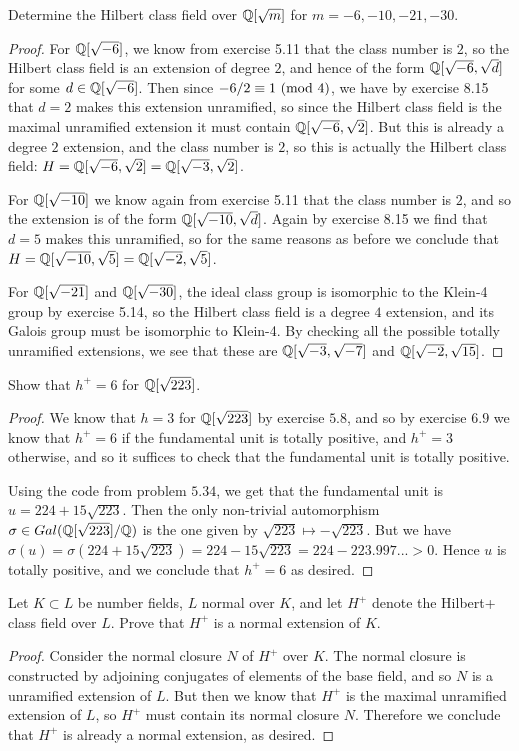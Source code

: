 \documentclass[11pt]{article}
\begin{document}
Determine the Hilbert class field over $\mathbb{Q}[\sqrt{m}]$ for $m = -6, -10, -21, -30$.
\begin{proof}
  For $\mathbb{Q}[\sqrt{-6}]$, we know from exercise 5.11 that the class number is $2$, so the Hilbert class field is an extension of degree $2$, and hence of the form $\mathbb{Q}[\sqrt{-6}, \sqrt{d}]$ for some $d \in \mathbb{Q}[\sqrt{-6}]$.
  Then since $-6/2 \equiv 1\ (\text{mod}\ 4)$, we have by exercise 8.15 that $d = 2$ makes this extension unramified, so since the Hilbert class field is the maximal unramified extension it must contain $\mathbb{Q}[\sqrt{-6}, \sqrt{2}]$.
  But this is already a degree $2$ extension, and the class number is $2$, so this is actually the Hilbert class field: $H = \mathbb{Q}[\sqrt{-6}, \sqrt{2}] = \mathbb{Q}[\sqrt{-3}, \sqrt{2}]$.

  For $\mathbb{Q}[\sqrt{-10}]$ we know again from exercise 5.11 that the class number is $2$, and so the extension is of the form $\mathbb{Q}[\sqrt{-10}, \sqrt{d}]$.
  Again by exercise 8.15 we find that $d = 5$ makes this unramified, so for the same reasons as before we conclude that $H = \mathbb{Q}[\sqrt{-10}, \sqrt{5}] = \mathbb{Q}[\sqrt{-2}, \sqrt{5}]$.

  For $\mathbb{Q}[\sqrt{-21}]$ and $\mathbb{Q}[\sqrt{-30}]$, the ideal class group is isomorphic to the Klein-4 group by exercise 5.14, so the Hilbert class field is a degree $4$ extension, and its Galois group must be isomorphic to Klein-4.
  By checking all the possible totally unramified extensions, we see that these are $\mathbb{Q}[\sqrt{-3},\sqrt{-7}]$ and $\mathbb{Q}[\sqrt{-2},\sqrt{15}]$.
\end{proof}


Show that $h^+ = 6$ for $\mathbb{Q}[\sqrt{223}]$.
\begin{proof}
  We know that $h = 3$ for $\mathbb{Q}[\sqrt{223}]$ by exercise $5.8$, and so by exercise $6.9$ we know that $h^+ = 6$ if the fundamental unit is totally positive, and $h^+ = 3$ otherwise, and so it suffices to check that the fundamental unit is totally positive.

  Using the code from problem $5.34$, we get that the fundamental unit is $u = 224 + 15\sqrt{223}$.
  Then the only non-trivial automorphism $\sigma \in Gal(\mathbb{Q}[\sqrt{223}]/\mathbb{Q})$ is the one given by $\sqrt{223} \mapsto -\sqrt{223}$.
  But we have $\sigma(u) = \sigma(224 + 15\sqrt{223}) = 224 - 15\sqrt{223} = 224 - 223.997... > 0$.
  Hence $u$ is totally positive, and we conclude that $h^+ = 6$ as desired.
\end{proof}


Let $K \subset L$ be number fields, $L$ normal over $K$, and let $H^+$ denote the Hilbert+ class field over $L$. Prove that $H^+$ is a normal extension of $K$.
\begin{proof}
  Consider the normal closure $N$ of $H^+$ over $K$.
  The normal closure is constructed by adjoining conjugates of elements of the base field, and so $N$ is a unramified extension of $L$.
  But then we know that $H^+$ is the maximal unramified extension of $L$, so $H^+$ must contain its normal closure $N$.
  Therefore we conclude that $H^+$ is already a normal extension, as desired.
\end{proof}
\end{document}
